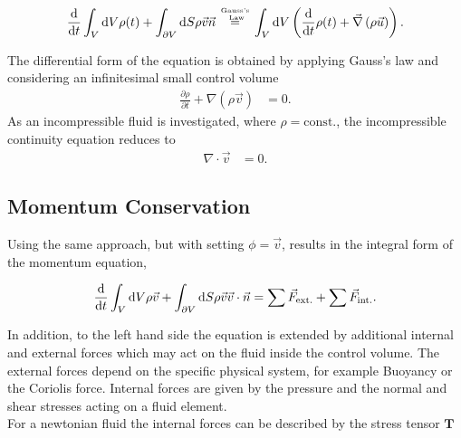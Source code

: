 \begin{align}
    \frac{\mathop{}\!\mathrm{d}}{\mathop{}\!\mathrm{d} t} \int_V \mathop{}\!\mathrm{d} V \rho(t) + \int_{\partial V}\mathop{}\!\mathrm{d} S \rho \vec{v}\vec{n}
     \stackrel{\text{Gauss's} \atop \text{ Law}}{=}
    \int_V \mathop{}\!\mathrm{d} V \left( \frac{\mathop{}\!\mathrm{d}}{\mathop{}\!\mathrm{d} t} \rho(t) + \vec{\nabla}\left(\rho \vec{u}\right)\right).
\end{align}

The differential form of the equation is obtained by applying Gauss's law and considering an infinitesimal small control volume
\begin{align}
     \frac{\partial \rho}{\partial t}  + \nabla \left(\rho \vec{v}\right) &= 0.
\end{align}
As an incompressible fluid is investigated, where $\rho = \text{const.}$, the incompressible continuity equation reduces to
\begin{align}
     \nabla \cdot \vec{v} &= 0.
\end{align}

\subsection{Momentum Conservation}

Using the same approach, but with setting $\phi = \vec{v}$, results in the integral form of the momentum equation,

\begin{align}
    \label{theorie:intimpulse}
    \frac{\mathop{}\!\mathrm{d}}{\mathop{}\!\mathrm{d} t} \int_V \mathop{}\!\mathrm{d} V \rho \vec{v} + \int_{\partial V} \mathop{}\!\mathrm{d} S \rho\vec{v}\vec{v}\cdot \vec{n}  =  \sum \vec{F}_{\text{ext.}} + \sum \vec{F}_{\text{int.}}.
\end{align}

In addition, to the left hand side the equation is extended by additional internal and external forces which may act on the fluid inside the control volume.
The external forces depend on the specific physical system, for example Buoyancy or the Coriolis force. Internal forces
are given by the pressure and the normal and shear stresses acting on a fluid element.\\
For a newtonian fluid the internal forces can be described by the stress tensor $\bm{T}$

